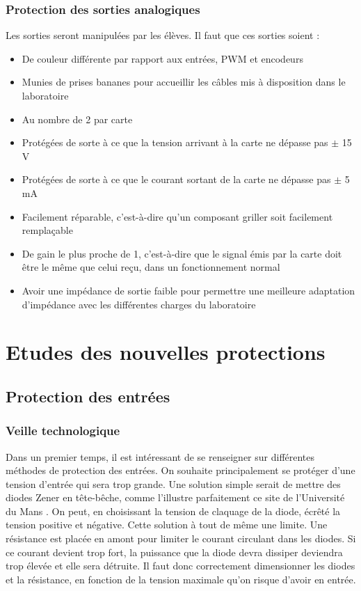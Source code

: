 \documentclass{report}
\begin{document}
\subsection{Protection des sorties analogiques}
Les sorties seront manipulées par les élèves. Il faut que ces sorties soient :
\begin{itemize}
\item De couleur différente par rapport aux entrées, PWM et encodeurs
\item Munies de prises bananes pour accueillir les câbles mis à disposition dans le laboratoire
\item Au nombre de 2 par carte
\item Protégées de sorte à ce que la tension arrivant à la carte ne dépasse pas $\pm$ 15 V
\item Protégées de sorte à ce que le courant sortant de la carte ne dépasse pas $\pm$ 5 mA
\item Facilement réparable, c'est-à-dire qu'un composant griller soit facilement remplaçable
\item De gain le plus proche de 1, c'est-à-dire que le signal émis par la carte doit être le même que celui reçu, dans un fonctionnement normal
\item Avoir une impédance de sortie faible pour permettre une meilleure adaptation d'impédance avec les différentes charges du laboratoire
\end{itemize}

\chapter{Etudes des nouvelles protections}

\section{Protection des entrées}
\subsection{Veille technologique}
Dans un premier temps, il est intéressant de se renseigner sur différentes méthodes de protection des entrées. On souhaite principalement se protéger d'une tension d'entrée qui sera trop grande. Une solution simple serait de mettre des diodes Zener en tête-bêche, comme l'illustre parfaitement ce site de l'Université du Mans \cite{Rousseau}. On peut, en choisissant la tension de claquage de la diode, écrêté la tension positive et négative. Cette solution à tout de même une limite. Une résistance est placée en amont pour limiter le courant circulant dans les diodes. Si ce courant devient trop fort, la puissance que la diode devra dissiper deviendra trop élevée et elle sera détruite. Il faut donc correctement dimensionner les diodes et la résistance, en fonction de la tension maximale qu'on risque d'avoir en entrée.
\end{document}
